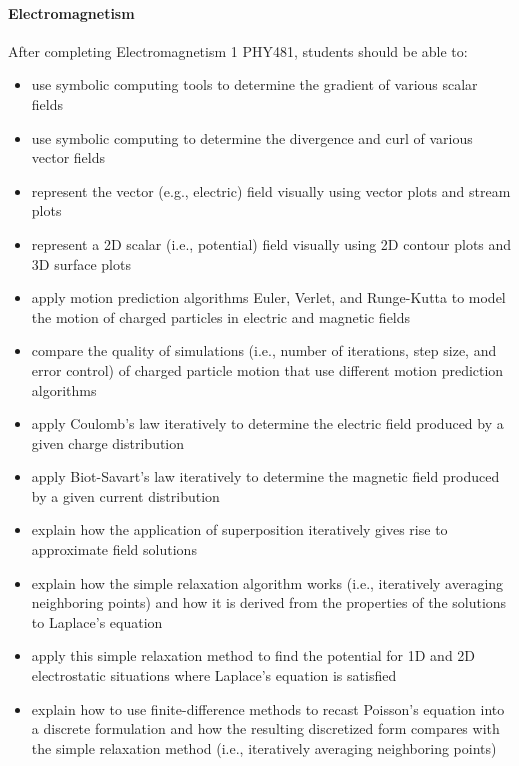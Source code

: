 \paragraph{Electromagnetism}
After completing Electromagnetism 1 PHY481, students should be able to:
\begin{itemize}
\item use symbolic computing tools to determine the gradient of various scalar fields

\item use symbolic computing to determine the divergence and curl of various vector fields

\item represent the vector (e.g., electric) field visually using vector plots and stream plots

\item represent a 2D scalar (i.e., potential) field visually using 2D contour plots and 3D surface plots

\item apply motion prediction algorithms Euler, Verlet, and Runge-Kutta to model the motion of charged particles in electric and magnetic fields

\item compare the quality of simulations (i.e., number of iterations, step size, and error control) of charged particle motion that use different motion prediction algorithms

\item apply Coulomb's law iteratively to determine the electric field produced by a given charge distribution

\item apply Biot-Savart's law iteratively to determine the magnetic field produced by a given current distribution

\item explain how the application of superposition iteratively gives rise to approximate field solutions

\item explain how the simple relaxation algorithm works (i.e., iteratively averaging neighboring points) and how it is derived from the properties of the solutions to Laplace's equation

\item apply this simple relaxation method to find the potential for 1D and 2D electrostatic situations where Laplace's equation is satisfied

\item explain how to use  finite-difference methods to recast Poisson's equation into a discrete formulation and how the resulting discretized form compares with the simple relaxation method (i.e., iteratively averaging neighboring points)


\end{itemize}
